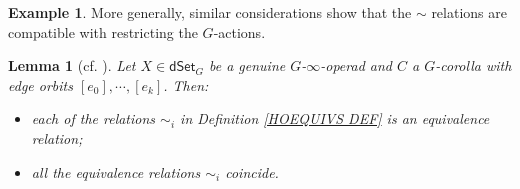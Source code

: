 \documentclass[a4paper,10pt
,draft
]{article}%
\numberwithin{equation}{section}
\numberwithin{figure}{section}
\newtheorem{lemma}[equation]{Lemma}%
\theoremstyle{definition} %
\newtheorem{example}[equation]{Example}%
\newcommand{\1}{\ensuremath{\mathbbm 1}}%
\begin{document}
\begin{example}
More generally, similar considerations show that the $\sim$ relations are compatible with restricting the $G$-actions.
\end{example}



\begin{lemma}[{cf. \cite[Prop. 6.3 and Lemma 6.4]{MW09}}]
	\label{EQUIVI LEM}
	Let $X \in \mathsf{dSet}_G$ be a genuine $G$-$\infty$-operad and $C$ a $G$-corolla with edge orbits
	$[e_0],\cdots,[e_k]$. Then:
\begin{itemize}
	\item[(a)] each of the relations $\sim_i$ 
	in Definition \ref{HOEQUIVS DEF}
	is an equivalence relation;
	\item[(b)] all the equivalence relations $\sim_i$ coincide.
\end{itemize}
\end{lemma}
\end{document}
